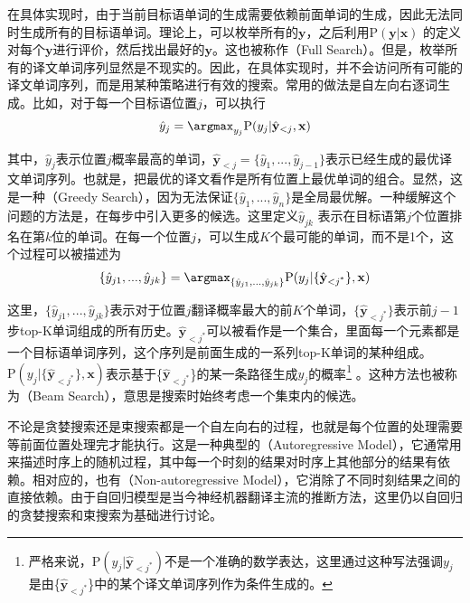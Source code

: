 \noindent 在具体实现时，由于当前目标语单词的生成需要依赖前面单词的生成，因此无法同时生成所有的目标语单词。理论上，可以枚举所有的$\mathbf{y}$，之后利用$\textrm{P}(\mathbf{y} | \mathbf{x})$ 的定义对每个$\mathbf{y}$进行评价，然后找出最好的$\mathbf{y}$。这也被称作{\small{}}（Full Search）。但是，枚举所有的译文单词序列显然是不现实的。因此，在具体实现时，并不会访问所有可能的译文单词序列，而是用某种策略进行有效的搜索。常用的做法是自左向右逐词生成。比如，对于每一个目标语位置$j$，可以执行
\begin{eqnarray}
\hat{y}_j = \argmax_{y_j} \textrm{P}(y_j | \hat{\mathbf{y}}_{<j} , \mathbf{x})
\label{eq:6-36}
\end{eqnarray}

\noindent 其中，$\hat{y}_j$表示位置$j$概率最高的单词，$\hat{\mathbf{y}}_{<j} = \{ \hat{y}_1,...,\hat{y}_{j-1} \}$表示已经生成的最优译文单词序列。也就是，把最优的译文看作是所有位置上最优单词的组合。显然，这是一种{\small{}}（Greedy Search），因为无法保证$\{ \hat{y}_1,...,\hat{y}_{n} \}$是全局最优解。一种缓解这个问题的方法是，在每步中引入更多的候选。这里定义$\hat{y}_{jk} $ 表示在目标语第$j$个位置排名在第$k$位的单词。在每一个位置$j$，可以生成$K$个最可能的单词，而不是1个，这个过程可以被描述为
\begin{eqnarray}
\{ \hat{y}_{j1},...,\hat{y}_{jk} \} = \argmax_{ \{ \hat{y}_{j1},...,\hat{y}_{jk} \} }
\textrm{P}(y_j | \{ \hat{\mathbf{y}}_{<{j^{\textrm{*}}}} \},\mathbf{x})
\label{eq:6-37}
\end{eqnarray}

\noindent 这里，$\{ \hat{y}_{j1},...,\hat{y}_{jk} \}$表示对于位置$j$翻译概率最大的前$K$个单词，$\{ \hat{\mathbf{y}}_{<j^{\ast}} \}$表示前$j-1$步top-K单词组成的所有历史。${\hat{\mathbf{y}}_{<j^{\ast}}}$可以被看作是一个集合，里面每一个元素都是一个目标语单词序列，这个序列是前面生成的一系列top-K单词的某种组成。$\textrm{P}(y_j | \{ \hat{\mathbf{y}}_{<{j^{\textrm{*}}}} \},\mathbf{x})$表示基于\{$ \hat{\mathbf{y}}_{<j^{\ast}} $\}的某一条路径生成$y_j$的概率\footnote{严格来说，P$(y_j | {\hat{\mathbf{y}}_{<j^{\ast}} })$不是一个准确的数学表达，这里通过这种写法强调$y_j$是由\{$ \hat{\mathbf{y}}_{<j^{\ast}} $\}中的某个译文单词序列作为条件生成的。} 。这种方法也被称为{\small{}}（Beam Search），意思是搜索时始终考虑一个集束内的候选。

\parinterval 不论是贪婪搜索还是束搜索都是一个自左向右的过程，也就是每个位置的处理需要等前面位置处理完才能执行。这是一种典型的{\small{}}（Autoregressive Model），它通常用来描述时序上的随机过程，其中每一个时刻的结果对时序上其他部分的结果有依赖\cite{NIPS2017_7181}。相对应的，也有{\small{}}（Non-autoregressive Model），它消除了不同时刻结果之间的直接依赖\cite{Gu2017NonAutoregressiveNM}。由于自回归模型是当今神经机器翻译主流的推断方法，这里仍以自回归的贪婪搜索和束搜索为基础进行讨论。

